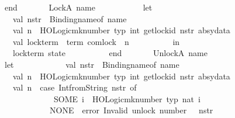 \begin{isabellebody}
\ \ \ \ \ \ \ \ \ \ end\isanewline
\isanewline
\ \ \ \ \ \ {\isacharbar}{\kern0pt}\ LockA\ name\ {\isacharequal}{\kern0pt}{\isachargreater}{\kern0pt}\isanewline
\ \ \ \ \ \ \ \ \ \ let\isanewline
\ \ \ \ \ \ \ \ \ \ \ \ val\ n{\isacharunderscore}{\kern0pt}str\ {\isacharequal}{\kern0pt}\ Binding{\isachardot}{\kern0pt}name{\isacharunderscore}{\kern0pt}of\ name\isanewline
\ \ \ \ \ \ \ \ \ \ \ \ val\ n\ {\isacharequal}{\kern0pt}\ HOLogic{\isachardot}{\kern0pt}mk{\isacharunderscore}{\kern0pt}number\ {\isacharat}{\kern0pt}{\isacharbraceleft}{\kern0pt}typ\ int{\isacharbraceright}{\kern0pt}\ {\isacharparenleft}{\kern0pt}get{\isacharunderscore}{\kern0pt}lock{\isacharunderscore}{\kern0pt}id\ n{\isacharunderscore}{\kern0pt}str\ absy{\isacharunderscore}{\kern0pt}data{\isacharparenright}{\kern0pt}\isanewline
\ \ \ \ \ \ \ \ \ \ \ \ val\ lock{\isacharunderscore}{\kern0pt}term\ {\isacharequal}{\kern0pt}\ {\isacharat}{\kern0pt}{\isacharbraceleft}{\kern0pt}term\ com{\isachardot}{\kern0pt}lock{\isacharbraceright}{\kern0pt}\ {\isachardollar}{\kern0pt}\ n\isanewline
\ \ \ \ \ \ \ \ \ \ in\isanewline
\ \ \ \ \ \ \ \ \ \ \ \ {\isacharparenleft}{\kern0pt}lock{\isacharunderscore}{\kern0pt}term{\isacharcomma}{\kern0pt}\ state{\isacharparenright}{\kern0pt}\isanewline
\ \ \ \ \ \ \ \ \ \ end\isanewline
\isanewline
\ \ \ \ \ \ {\isacharbar}{\kern0pt}\ UnlockA\ name\ {\isacharequal}{\kern0pt}{\isachargreater}{\kern0pt}\isanewline
\ \ \ \ \ \ \ \ \ \ let\isanewline
\ \ \ \ \ \ \ \ \ \ \ \ val\ n{\isacharunderscore}{\kern0pt}str\ {\isacharequal}{\kern0pt}\ Binding{\isachardot}{\kern0pt}name{\isacharunderscore}{\kern0pt}of\ name\isanewline
\ \ \ \ \ \ \ \ \ \ \ \ val\ n\ {\isacharequal}{\kern0pt}\ HOLogic{\isachardot}{\kern0pt}mk{\isacharunderscore}{\kern0pt}number\ {\isacharat}{\kern0pt}{\isacharbraceleft}{\kern0pt}typ\ int{\isacharbraceright}{\kern0pt}\ {\isacharparenleft}{\kern0pt}get{\isacharunderscore}{\kern0pt}lock{\isacharunderscore}{\kern0pt}id\ n{\isacharunderscore}{\kern0pt}str\ absy{\isacharunderscore}{\kern0pt}data{\isacharparenright}{\kern0pt}\isanewline
\ \ \ \ \ \ \ \ \ \ \ \ {\isacharparenleft}{\kern0pt}{\isacharasterisk}{\kern0pt}val\ n\ {\isacharequal}{\kern0pt}\ case\ Int{\isachardot}{\kern0pt}fromString\ n{\isacharunderscore}{\kern0pt}str\ of\isanewline
\ \ \ \ \ \ \ \ \ \ \ \ \ \ \ \ \ \ \ \ \ \ SOME\ i\ {\isacharequal}{\kern0pt}{\isachargreater}{\kern0pt}\ HOLogic{\isachardot}{\kern0pt}mk{\isacharunderscore}{\kern0pt}number\ {\isacharat}{\kern0pt}{\isacharbraceleft}{\kern0pt}typ\ nat{\isacharbraceright}{\kern0pt}\ i\isanewline
\ \ \ \ \ \ \ \ \ \ \ \ \ \ \ \ \ \ \ \ {\isacharbar}{\kern0pt}\ NONE\ {\isacharequal}{\kern0pt}{\isachargreater}{\kern0pt}\ error\ {\isacharparenleft}{\kern0pt}{\isachardoublequote}{\kern0pt}Invalid\ unlock\ number{\isacharcolon}{\kern0pt}\ {\isachardoublequote}{\kern0pt}\ {\isacharcircum}{\kern0pt}\ n{\isacharunderscore}{\kern0pt}str{\isacharparenright}{\kern0pt}{\isacharasterisk}{\kern0pt}{\isacharparenright}{\kern0pt}\isanewline

\end{isabellebody}
